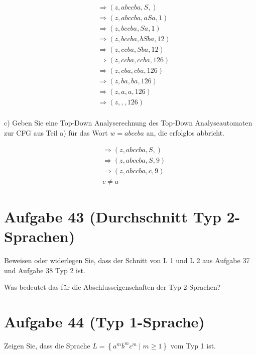 \documentclass{article}
\begin{document}
\begin{equation}
\begin{split}
&\Rightarrow(z, abccba, S, ) \\\ 
&\Rightarrow(z, abccba, aSa, 1) \\\ 
&\Rightarrow(z, bccba, Sa, 1) \\\ 
&\Rightarrow(z, bccba, bSba, 1 2) \\\ 
&\Rightarrow(z, ccba, Sba, 1 2) \\\
&\Rightarrow(z, ccba, ccba, 1 2 6) \\\
&\Rightarrow(z, cba, cba, 1 2 6) \\\
&\Rightarrow(z, ba, ba, 1 2 6) \\\
&\Rightarrow(z, a, a, 1 2 6) \\\
&\Rightarrow(z, , , 1 2 6) \\\
\end{split}
\end{equation}


c) Geben Sie eine Top-Down Analyserechnung des Top-Down Analyseautomaten zur CFG aus Teil a) für das Wort $w=abccba$ an, die erfolglos abbricht.

\begin{equation}
\begin{split}
&\Rightarrow(z, abccba, S, ) \\\ 
&\Rightarrow(z, abccba, S, 9) \\\ 
&\Rightarrow(z, abccba, c, 9) \\\ 
&c \neq a
\end{split}
\end{equation}


\section*{Aufgabe 43 (Durchschnitt Typ 2-Sprachen)}

Beweisen oder widerlegen Sie, dass der Schnitt von L 1 und L 2 aus Aufgabe 37 und Aufgabe 38 Typ 2 ist.


Was bedeutet das für die Abschlusseigenschaften der Typ 2-Sprachen?


\section*{Aufgabe 44 (Typ 1-Sprache)}

Zeigen Sie, dass die Sprache $L = \left\{a^m b^m c^m \mid m \geq 1\right\}$ vom Typ 1 ist.
\end{document}
